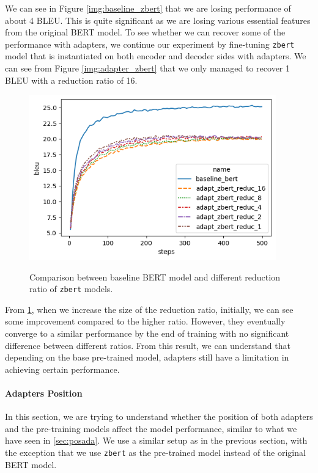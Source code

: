 We can see in Figure \ref{img:baseline_zbert} that we are losing performance of about 4 BLEU. This is quite significant as we are losing various essential features from the original BERT model. To see whether we can recover some of the performance with adapters, we continue our experiment by fine-tuning \texttt{zbert} model that is instantiated on both encoder and decoder sides with adapters. We can see from Figure \ref{img:adapter_zbert} that we only managed to recover 1 BLEU with a reduction ratio of 16.

\begin{figure}[]
    {\includegraphics[width=0.95\textwidth]{img/adapter_zbert_ratio.png}}
    \centering
    \caption{Comparison between baseline BERT model and different reduction ratio of \texttt{zbert} models.}
    \label{img:adapter_zbert_ratio}
\end{figure}

From \cref{img:adapter_zbert_ratio}, when we increase the size of the reduction ratio, initially, we can see some improvement compared to the higher ratio. However, they eventually converge to a similar performance by the end of training with no significant difference between different ratios. From this result, we can understand that depending on the base pre-trained model, adapters still have a limitation in achieving certain performance.

\paragraph{Adapters Position}
In this section, we are trying to understand whether the position of both adapters and the pre-training models affect the model performance, similar to what we have seen in \cref{sec:posada}. We use a similar setup as in the previous section, with the exception that we use \texttt{zbert} as the pre-trained model instead of the original BERT model.

